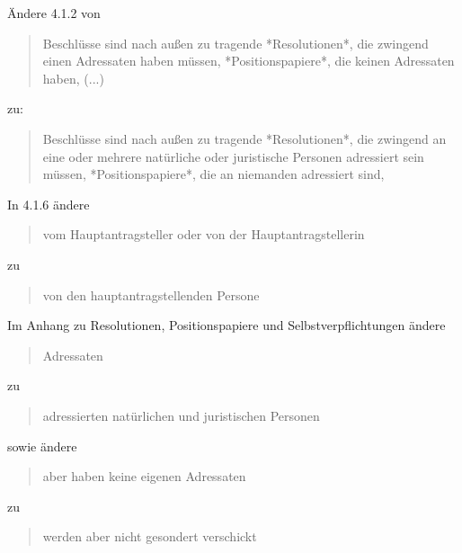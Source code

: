 \documentclass[draft,10pt,oneside]{scrartcl}
\begin{document}
Ändere 4.1.2 von
\begin{quote}
    Beschlüsse sind nach außen zu tragende *Resolutionen*, die zwingend einen
    Adressaten haben müssen, *Positionspapiere*, die keinen Adressaten haben, (...)
\end{quote}
zu:
\begin{quote}
    Beschlüsse sind nach außen zu tragende *Resolutionen*, die zwingend an
    eine oder mehrere natürliche oder juristische Personen adressiert sein
    müssen, *Positionspapiere*, die an niemanden adressiert sind,
\end{quote}

In 4.1.6 ändere
\begin{quote}
    vom Hauptantragsteller oder von der Hauptantragstellerin
\end{quote}
zu
\begin{quote}
    von den hauptantragstellenden Persone
\end{quote}

Im Anhang zu Resolutionen, Positionspapiere und Selbstverpflichtungen ändere
\begin{quote}
    Adressaten
\end{quote}
zu
\begin{quote}
    adressierten natürlichen und juristischen Personen
\end{quote}
sowie ändere
\begin{quote}
    aber haben keine eigenen Adressaten
\end{quote}
zu
\begin{quote}
    werden aber nicht gesondert verschickt
\end{quote}
\end{document}
